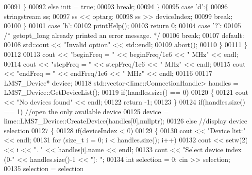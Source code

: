 \begin{DoxyCode}
00091             \}
00092             \textcolor{keywordflow}{else} init = \textcolor{keyword}{true};
00093             \textcolor{keywordflow}{break};
00094         \}
00095         \textcolor{keywordflow}{case} \textcolor{charliteral}{'d'}:\{
00096             stringstream ss;
00097             ss << optarg;
00098             ss >> deviceIndex;
00099             \textcolor{keywordflow}{break};
00100         \}
00101         \textcolor{keywordflow}{case} \textcolor{charliteral}{'h'}:
00102             printHelp();
00103             \textcolor{keywordflow}{return} 0;
00104         \textcolor{keywordflow}{case} \textcolor{charliteral}{'?'}:
00105             \textcolor{comment}{/* getopt\_long already printed an error message. */}
00106             \textcolor{keywordflow}{break};
00107         \textcolor{keywordflow}{default}:
00108             std::cout << \textcolor{stringliteral}{"Invalid option"} << std::endl;
00109             abort();
00110         \}
00111     \}
00112 
00113     cout << \textcolor{stringliteral}{"beginFreq = "} << beginFreq/1e6 << \textcolor{stringliteral}{" MHz"} << endl;
00114     cout << \textcolor{stringliteral}{"stepFreq  = "} << stepFreq/1e6 << \textcolor{stringliteral}{" MHz"} << endl;
00115     cout << \textcolor{stringliteral}{"endFreq   = "} << endFreq/1e6 << \textcolor{stringliteral}{" MHz"} << endl;
00116 
00117     LMS7_Device* device;
00118     std::vector<lime::ConnectionHandle> handles = LMS7\_Device::GetDeviceList();
00119     \textcolor{keywordflow}{if}(handles.size() == 0)
00120     \{
00121         cout << \textcolor{stringliteral}{"No devices found"} << endl;
00122         \textcolor{keywordflow}{return} -1;
00123     \}
00124     \textcolor{keywordflow}{if}(handles.size() == 1) \textcolor{comment}{//open the only available device}
00125         device = lime::LMS7_Device::CreateDevice(handles[0],\textcolor{keyword}{nullptr});
00126     \textcolor{keywordflow}{else} \textcolor{comment}{//display device selection}
00127     \{
00128         \textcolor{keywordflow}{if}(deviceIndex < 0)
00129         \{
00130             cout << \textcolor{stringliteral}{"Device list:"} << endl;
00131             \textcolor{keywordflow}{for} (\textcolor{keywordtype}{size\_t} i = 0; i < handles.size(); i++)
00132                cout << setw(2) << i << \textcolor{stringliteral}{". "} << handles[i].name << endl;
00133             cout << \textcolor{stringliteral}{"Select device index (0-"} << handles.size()-1 << \textcolor{stringliteral}{"): "};
00134             \textcolor{keywordtype}{int} selection = 0; cin >> selection;
00135             selection = selection %

\end{DoxyCode}
